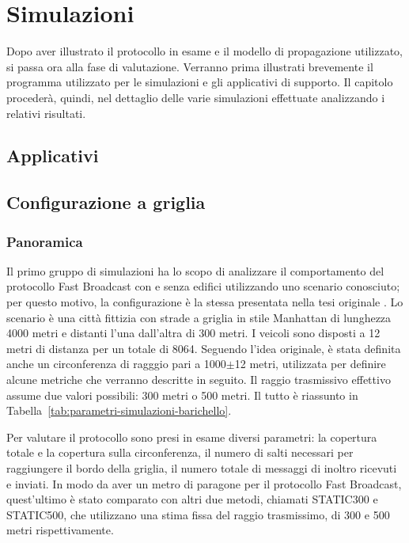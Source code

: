 %
\chapter{Simulazioni}
Dopo aver illustrato il protocollo in esame e il modello di propagazione utilizzato, si passa ora alla fase di valutazione.
Verranno prima illustrati brevemente il programma utilizzato per le simulazioni e gli applicativi di supporto.
Il capitolo procederà, quindi, nel dettaglio delle varie simulazioni effettuate analizzando i relativi risultati.
%
\section{Applicativi}\label{sec:applicativi}
%
%
\section{Configurazione a griglia}
\subsection{Panoramica}
Il primo gruppo di simulazioni ha lo scopo di analizzare il comportamento del protocollo Fast Broadcast con e senza edifici utilizzando uno scenario conosciuto;
per questo motivo, la configurazione è la stessa presentata nella tesi originale \cite{Barichello2017propagazione}.
Lo scenario è una città fittizia con strade a griglia in stile Manhattan di lunghezza 4000 metri e distanti l'una dall'altra di 300 metri.
I veicoli sono disposti a 12 metri di distanza per un totale di 8064.
Seguendo l'idea originale, è stata definita anche un circonferenza di ragggio pari a 1000$\pm$12 metri, utilizzata per definire alcune metriche che verranno descritte in seguito.
Il raggio trasmissivo effettivo assume due valori possibili: 300 metri o 500 metri.
Il tutto è riassunto in Tabella~\ref{tab:parametri-simulazioni-barichello}.

Per valutare il protocollo sono presi in esame diversi parametri: la copertura totale e la copertura sulla circonferenza,
il numero di salti necessari per raggiungere il bordo della griglia, il numero totale di messaggi di inoltro ricevuti e inviati.
In modo da aver un metro di paragone per il protocollo Fast Broadcast, quest'ultimo è stato comparato con altri due metodi, chiamati STATIC300 e STATIC500,
che utilizzano una stima fissa del raggio trasmissimo, di 300 e 500 metri rispettivamente.

